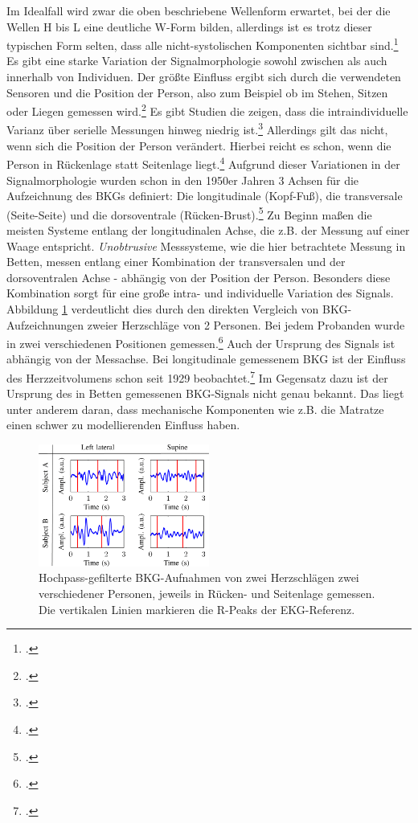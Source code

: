 	Im Idealfall wird zwar die oben beschriebene Wellenform erwartet, bei der die Wellen H bis L eine deutliche W-Form bilden, allerdings ist es trotz dieser typischen Form selten, dass alle nicht-systolischen Komponenten sichtbar sind.\footcite[Vgl.][]{Pinheiro2010} Es gibt eine starke Variation der Signalmorphologie sowohl zwischen als auch innerhalb von Individuen. Der größte Einfluss ergibt sich durch die verwendeten Sensoren und die Position der Person, also zum Beispiel ob im Stehen, Sitzen oder Liegen gemessen wird.\footcite[Vgl.][]{Sadek2019} Es gibt Studien die zeigen, dass die intraindividuelle Varianz über serielle Messungen hinweg niedrig ist.\footcite[Vgl.][]{Inan2015} Allerdings gilt das nicht, wenn sich die Position der Person verändert. Hierbei reicht es schon, wenn die Person in Rückenlage statt Seitenlage liegt.\footcite[Vgl.][]{Bruser2011} Aufgrund dieser Variationen in der Signalmorphologie wurden schon in den 1950er Jahren 3 Achsen für die Aufzeichnung des \ac{BKG}s definiert: Die longitudinale (Kopf-Fuß), die transversale (Seite-Seite) und die dorsoventrale (Rücken-Brust).\footcite[][Vgl.]{Bruser2011, Inan2015} Zu Beginn maßen die meisten Systeme entlang der longitudinalen Achse, die z.B. der Messung auf einer Waage entspricht. \textit{Unobtrusive} Messsysteme, wie die hier betrachtete Messung in Betten, messen entlang einer Kombination der transversalen und der dorsoventralen Achse - abhängig von der Position der Person. Besonders diese Kombination sorgt für eine große intra- und individuelle Variation des Signals. Abbildung \ref{fig:bcg2postures} verdeutlicht dies durch den direkten Vergleich von \ac{BKG}-Aufzeichnungen zweier Herzschläge von 2 Personen. Bei jedem Probanden wurde in zwei verschiedenen Positionen gemessen.\footcite{Bruser2011} Auch der Ursprung des Signals ist abhängig von der Messachse. Bei longitudinale gemessenem \ac{BKG} ist der Einfluss des Herzzeitvolumens schon seit 1929 beobachtet.\footcite[Vgl.][]{Starr1939} Im Gegensatz dazu ist der Ursprung des in Betten gemessenen \ac{BKG}-Signals nicht genau bekannt. Das liegt unter anderem daran, dass mechanische Komponenten wie z.B. die Matratze einen schwer zu modellierenden Einfluss haben.
	
	\begin{figure}[H]
		\centering
		\includegraphics[width=0.5\textwidth]{pic/bcg2postures.png}
		\caption[\ac{BKG}-Aufnahmen in Rücken- und Seitenlage]{Hochpass-gefilterte \ac{BKG}-Aufnahmen von zwei Herzschlägen zwei verschiedener Personen, jeweils in Rücken- und Seitenlage gemessen. Die vertikalen Linien markieren die R-Peaks der EKG-Referenz.\protect\footnotemark}
		\label{fig:bcg2postures}
	\end{figure}
	
